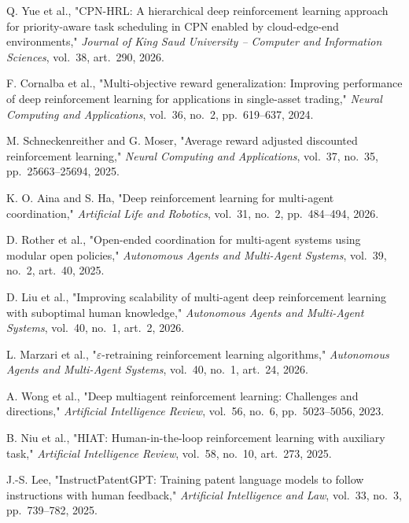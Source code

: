 Q. Yue et al., "CPN-HRL: A hierarchical deep reinforcement learning approach for priority-aware task scheduling in CPN enabled by cloud-edge-end environments," \textit{Journal of King Saud University -- Computer and Information Sciences}, vol.~38, art.~290, 2026.

F. Cornalba et al., "Multi-objective reward generalization: Improving performance of deep reinforcement learning for applications in single-asset trading," \textit{Neural Computing and Applications}, vol.~36, no.~2, pp.~619--637, 2024.

M. Schneckenreither and G. Moser, "Average reward adjusted discounted reinforcement learning," \textit{Neural Computing and Applications}, vol.~37, no.~35, pp.~25663--25694, 2025.

K. O. Aina and S. Ha, "Deep reinforcement learning for multi-agent coordination," \textit{Artificial Life and Robotics}, vol.~31, no.~2, pp.~484--494, 2026.

D. Rother et al., "Open-ended coordination for multi-agent systems using modular open policies," \textit{Autonomous Agents and Multi-Agent Systems}, vol.~39, no.~2, art.~40, 2025.

D. Liu et al., "Improving scalability of multi-agent deep reinforcement learning with suboptimal human knowledge," \textit{Autonomous Agents and Multi-Agent Systems}, vol.~40, no.~1, art.~2, 2026.

L. Marzari et al., "$\varepsilon$-retraining reinforcement learning algorithms," \textit{Autonomous Agents and Multi-Agent Systems}, vol.~40, no.~1, art.~24, 2026.

A. Wong et al., "Deep multiagent reinforcement learning: Challenges and directions," \textit{Artificial Intelligence Review}, vol.~56, no.~6, pp.~5023--5056, 2023.

B. Niu et al., "HIAT: Human-in-the-loop reinforcement learning with auxiliary task," \textit{Artificial Intelligence Review}, vol.~58, no.~10, art.~273, 2025.

J.-S. Lee, "InstructPatentGPT: Training patent language models to follow instructions with human feedback," \textit{Artificial Intelligence and Law}, vol.~33, no.~3, pp.~739--782, 2025.

